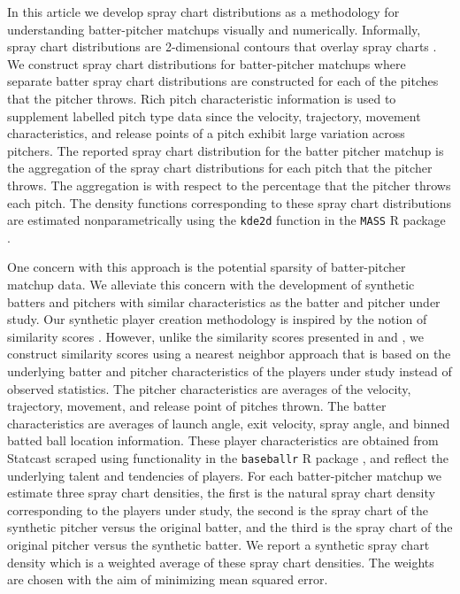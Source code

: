 \documentclass[11pt]{article}
\begin{document}
In this article we develop spray chart distributions as a methodology for understanding batter-pitcher matchups visually and numerically. Informally, spray chart distributions are 2-dimensional contours that overlay spray charts \citep{pettispray, marchi2019analyzing}. We construct spray chart distributions for batter-pitcher matchups where separate batter spray chart distributions are constructed for each of the pitches that the pitcher throws. Rich pitch characteristic information is used to supplement labelled pitch type data since the velocity, trajectory, movement characteristics, and release points of a pitch exhibit large variation across pitchers. The reported spray chart distribution for the batter pitcher matchup is the aggregation of the spray chart distributions for each pitch that the pitcher throws. The aggregation is with respect to the percentage that the pitcher throws each pitch. The density functions corresponding to these spray chart distributions are estimated nonparametrically using the \texttt{kde2d} function in the \texttt{MASS} R package \citep{MASS}.

One concern with this approach is the potential sparsity of batter-pitcher matchup data. We alleviate this concern with the development of synthetic batters and pitchers with similar characteristics as the batter and pitcher under study. Our synthetic player creation methodology is inspired by the notion of similarity scores \citep{james1994politics, PECOTA}. However, unlike the similarity scores presented in \cite{james1994politics} and \cite{PECOTA}, we construct similarity scores using a nearest neighbor approach that is based on the underlying batter and pitcher characteristics of the players under study instead of observed statistics. The pitcher characteristics are averages of the velocity, trajectory, movement, and release point of pitches thrown. The batter characteristics are averages of launch angle, exit velocity, spray angle, and binned batted ball location information. These player characteristics are obtained from Statcast \citep{statcast}scraped using functionality in the \texttt{baseballr} R package \citep{baseballr}, and reflect the underlying talent and tendencies of players. For each batter-pitcher matchup we estimate three spray chart densities, the first is the natural spray chart density corresponding to the players under study, the second is the spray chart of the synthetic pitcher versus the original batter, and the third is the spray chart of the original pitcher versus the synthetic batter. We report a synthetic spray chart density which is a weighted average of these spray chart densities. The weights are chosen with the aim of minimizing mean squared error.
\end{document}
